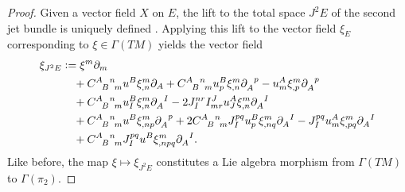 \begin{proof}
  Given a vector field $X$ on $E$, the lift to the total space $J^2E$ of the second jet bundle is uniquely defined \cite{Saunders_1989}. Applying this lift to the vector field $\xi_E$ corresponding to $\xi\in \Gamma(TM)$ yields the vector field
  \begin{equation}\label{vector_field_2nd_prolongation}
    \begin{aligned}
      \xi_{J^2E} &{} \vcentcolon= \xi^m\partial_m \\
                 &{} \hphantom{\vcentcolon=} + \gmc{A}{B}{n}{m} u^B \xi^m_{,n}\partial_A + \gmc{A}{B}{n}{m} u^B_p\xi^m_{,n}\partial_A^{\hphantom Ap} - u^A_m\xi^m_{,p}\partial_A^{\hphantom Ap} \\
                 &{} \hphantom{\vcentcolon=} + \gmc{A}{B}{n}{m} u^B_I \xi^m_{,n} \partial_A^{\hphantom AI} - 2 J_I^{nr}I^J_{mr}u^A_J\xi^m_{,n}\partial_A^{\hphantom AI} \\
                 &{} \hphantom{\vcentcolon=} + \gmc{A}{B}{n}{m} u^B \xi^m_{,np} \partial_A^{\hphantom Ap} + 2 \gmc{A}{B}{n}{m} J_I^{pq} u^B_p \xi^m_{,nq} \partial_A^{\hphantom AI} - J_I^{pq} u^A_m \xi^m_{,pq} \partial_A^{\hphantom AI} \\
                 &{} \hphantom{\vcentcolon=} + \gmc{A}{B}{n}{m} J_I^{pq} u^B \xi^m_{,npq} \partial_A^{\hphantom AI}.
    \end{aligned}
  \end{equation}
  Like before, the map $\xi\mapsto\xi_{J^2E}$ constitutes a Lie algebra morphism from $\Gamma(TM)$ to $\Gamma(\pi_2)$.


\end{proof}
